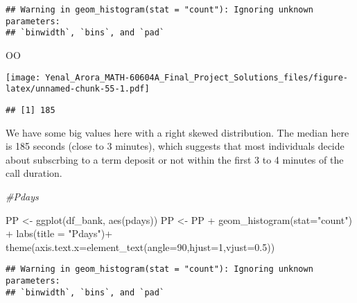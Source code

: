 \documentclass[
]{article}
\newenvironment{Shaded}{\begin{snugshade}}{\end{snugshade}}
\newcommand{\AttributeTok}[1]{\textcolor[rgb]{0.77,0.63,0.00}{#1}}
\newcommand{\CommentTok}[1]{\textcolor[rgb]{0.56,0.35,0.01}{\textit{#1}}}
\newcommand{\DecValTok}[1]{\textcolor[rgb]{0.00,0.00,0.81}{#1}}
\newcommand{\FloatTok}[1]{\textcolor[rgb]{0.00,0.00,0.81}{#1}}
\newcommand{\FunctionTok}[1]{\textcolor[rgb]{0.00,0.00,0.00}{#1}}
\newcommand{\NormalTok}[1]{#1}
\newcommand{\OtherTok}[1]{\textcolor[rgb]{0.56,0.35,0.01}{#1}}
\newcommand{\SpecialCharTok}[1]{\textcolor[rgb]{0.00,0.00,0.00}{#1}}
\newcommand{\StringTok}[1]{\textcolor[rgb]{0.31,0.60,0.02}{#1}}
\begin{document}
\begin{verbatim}
## Warning in geom_histogram(stat = "count"): Ignoring unknown parameters:
## `binwidth`, `bins`, and `pad`
\end{verbatim}

\begin{Shaded}
\begin{Highlighting}[]
\NormalTok{OO}
\end{Highlighting}
\end{Shaded}

\texttt{[image: Yenal\_Arora\_MATH-60604A\_Final\_Project\_Solutions\_files/figure-latex/unnamed-chunk-55-1.pdf]}

\begin{Shaded}
\end{Shaded}

\begin{verbatim}
## [1] 185
\end{verbatim}

We have some big values here with a right skewed distribution. The
median here is 185 seconds (close to 3 minutes), which suggests that
most individuals decide about subscrbing to a term deposit or not within
the first 3 to 4 minutes of the call duration.

\begin{Shaded}
\begin{Highlighting}[]
\CommentTok{\#Pdays}

\NormalTok{PP }\OtherTok{\textless{}{-}} \FunctionTok{ggplot}\NormalTok{(df\_bank, }\FunctionTok{aes}\NormalTok{(pdays))}
\NormalTok{PP }\OtherTok{\textless{}{-}}\NormalTok{ PP }\SpecialCharTok{+} \FunctionTok{geom\_histogram}\NormalTok{(}\AttributeTok{stat=}\StringTok{"count"}\NormalTok{) }\SpecialCharTok{+} \FunctionTok{labs}\NormalTok{(}\AttributeTok{title =} \StringTok{"Pdays"}\NormalTok{)}\SpecialCharTok{+}
  \FunctionTok{theme}\NormalTok{(}\AttributeTok{axis.text.x=}\FunctionTok{element\_text}\NormalTok{(}\AttributeTok{angle=}\DecValTok{90}\NormalTok{,}\AttributeTok{hjust=}\DecValTok{1}\NormalTok{,}\AttributeTok{vjust=}\FloatTok{0.5}\NormalTok{))}
\end{Highlighting}
\end{Shaded}

\begin{verbatim}
## Warning in geom_histogram(stat = "count"): Ignoring unknown parameters:
## `binwidth`, `bins`, and `pad`
\end{verbatim}
\end{document}
